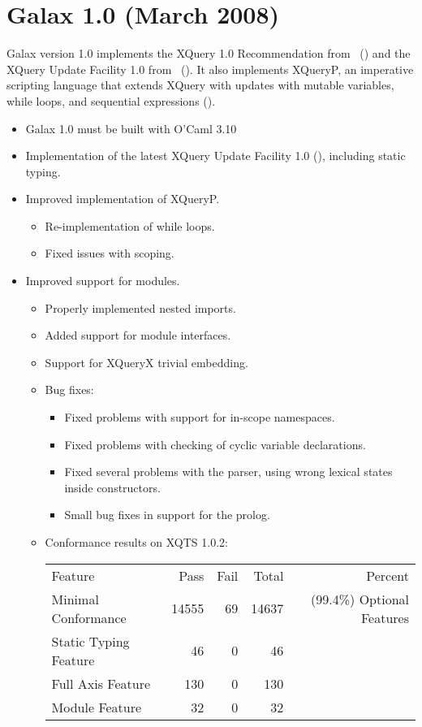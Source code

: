 \section{Galax 1.0 (March 2008)}

Galax version 1.0 implements the XQuery 1.0 Recommendation from
\xqueryrec\ (\xqueryurl) and the XQuery Update Facility 1.0 from
\ultfwd\ (\ultfurl).  It also implements XQueryP, an imperative
scripting language that extends XQuery with updates with mutable
variables, while loops, and sequential expressions (\xqueryp).

\begin{itemize}
\item Galax 1.0 must be built with O'Caml 3.10
\item Implementation of the latest XQuery Update Facility 1.0
(\ultfurl), including static typing.
\item Improved implementation of XQueryP.
\begin{itemize}
      \item Re-implementation of while loops.
      \item Fixed issues with scoping.
\end{itemize}
\item Improved support for modules.
\begin{itemize}
      \item Properly implemented nested imports.
      \item Added support for module interfaces.
\item Support for XQueryX trivial embedding.
\item Bug fixes:
\begin{itemize}
      \item Fixed problems with support for in-scope namespaces.
      \item Fixed problems with checking of cyclic variable declarations.
      \item Fixed several problems with the parser, using wrong lexical states inside constructors.
      \item Small bug fixes in support for the prolog.
\end{itemize}
\item Conformance results on XQTS 1.0.2:
\begin{tabular}{lrrrr}
  Feature & Pass & Fail & Total & Percent\\
  Minimal Conformance      &       14555 & 69 & 14637 & (99.4\%)
  Optional Features \\
    Static Typing Feature   &      46    & 0   & 46 \\
    Full Axis Feature        &     130  & 0   & 130\\
    Module Feature            &    32    & 0   & 32\\
\end{tabular}
\end{itemize}
\end{itemize}

